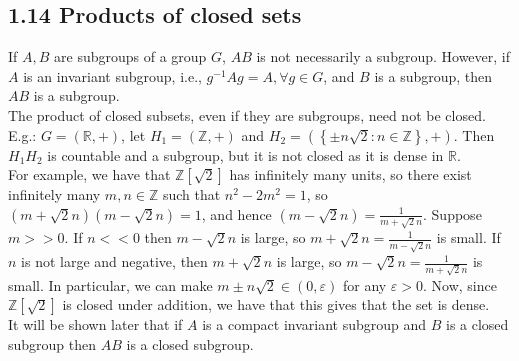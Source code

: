 \documentclass[a4paper]{article}
\theoremstyle{plain}%
\theoremstyle{definition}
\theoremstyle{remark}
\begin{document}
\subsection*{1.14 \quad Products of closed sets}
If $A,B$ are subgroups of a group $G$, $AB$ is not necessarily a subgroup.
However, if $A$ is an invariant subgroup, i.e., $g^{-1}Ag = A, \forall g \in
G$, and $B$ is a subgroup, then $AB$ is a subgroup.\\
\linebreak
The product of closed subsets, even if they are subgroups, need not be
closed.\\
E.g.: $G = \left( \mathbb{R},+ \right) $, let $H_1 = \left( \mathbb{Z},+
\right) $ and
$H_2 = \left( \left\{ \pm n \sqrt{2}  \colon n \in \mathbb{Z} \right\} ,+
\right) $. Then $H_1 H_2$ is countable and a subgroup, but it is not closed as
it is dense in $\mathbb{R}$.\\
For example, we have that $\mathbb{Z}\left[ \sqrt{2}  \right] $ has infinitely
many units, so there exist infinitely many
$m,n \in \mathbb{Z}$ such that
$n ^2 - 2 m^2 = 1$, so 
$(m + \sqrt{2} n) (m-\sqrt{2} n) = 1$, and hence
$\left( m - \sqrt{2} n \right) = \frac{1}{m + \sqrt{2} n}$. Suppose
$m > >0$. If $n < <0$ then $m - \sqrt{2} n$ is large, so
$m + \sqrt{2} n = \frac{1}{m - \sqrt{2} n}$ is small. If $n$ is not large and
negative, then $m + \sqrt{2} n$ is large, so
$m - \sqrt{2} n = \frac{1}{m + \sqrt{2} n}$ is small. In particular, we can
make
$m \pm n \sqrt{2}  \in \left( 0, \varepsilon \right) $ for any $\varepsilon
>0$. Now, since $\mathbb{Z} \left[ \sqrt{2}  \right] $ is closed under
addition, we have that this gives that the set is dense.\\
\linebreak
It will be shown later that if $A$ is a compact invariant subgroup and $B$ is
a closed subgroup then $AB$ is a closed subgroup.\\
\linebreak
\end{document}
